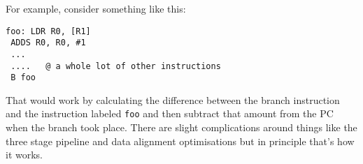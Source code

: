 For example, consider something like this:
\begin{lstlisting}[fontadjust=true,frame=trBL]
foo: LDR R0, [R1]
 ADDS R0, R0, #1
 ...
 ....   @ a whole lot of other instructions
 B foo
\end{lstlisting}
That would work by calculating the difference between the branch instruction and the instruction labeled \texttt{foo} and then subtract that amount from the PC when the branch took place. There are slight complications around things like the three stage pipeline and data alignment optimisations but in principle that's how it works. 
